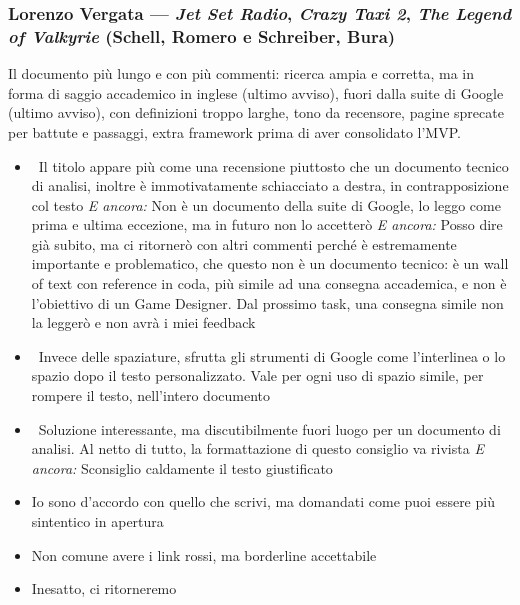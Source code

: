 \subsubsection{Lorenzo Vergata --- \emph{Jet Set Radio}, \emph{Crazy Taxi 2},
\emph{The Legend of Valkyrie} (Schell, Romero e Schreiber, Bura)}
Il documento più lungo e con più commenti: ricerca ampia e corretta, ma in
forma di saggio accademico in inglese (ultimo avviso), fuori dalla suite di
Google (ultimo avviso), con definizioni troppo larghe, tono da recensore,
pagine sprecate per battute e passaggi, extra framework prima di aver
consolidato l'MVP.
{\small
\begin{itemize}
  \item {} \rvAvviso\ Il titolo appare più come una recensione piuttosto che un documento tecnico di analisi, inoltre è immotivatamente schiacciato a destra, in contrapposizione col testo \emph{E ancora:} Non è un documento della suite di Google, lo leggo come prima e ultima eccezione, ma in futuro non lo accetterò \emph{E ancora:} Posso dire già subito, ma ci ritornerò con altri commenti perché è estremamente importante e problematico, che questo non è un documento tecnico: è un wall of text con reference in coda, più simile ad una consegna accademica, e non è l'obiettivo di un Game Designer. Dal prossimo task, una consegna simile non la leggerò e non avrà i miei feedback
  \item \rvVuoto\ Invece delle spaziature, sfrutta gli strumenti di Google come l'interlinea o lo spazio dopo il testo personalizzato. Vale per ogni uso di spazio simile, per rompere il testo, nell'intero documento
  \item {} \rvBene\ Soluzione interessante, ma discutibilmente fuori luogo per un documento di analisi. Al netto di tutto, la formattazione di questo consiglio va rivista \emph{E ancora:} Sconsiglio caldamente il testo giustificato
  \item {} Io sono d'accordo con quello che scrivi, ma domandati come puoi essere più sintentico in apertura
  \item {} Non comune avere i link rossi, ma borderline accettabile
  \item {} Inesatto, ci ritorneremo

\end{itemize}}

